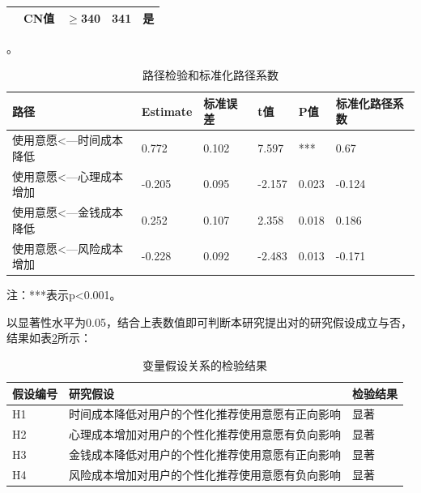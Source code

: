 \documentclass[12pt,UTF8]{ctexart}
\begin{document}
\begin{spacing}{1.25}
\begin{table}[H]
\begin{tabular}{@{}lllll@{}}
\textbf{}        & CN值                   & $\geq$340       & 341             & 是               \\ \bottomrule
\end{tabular}
\end{table}
。
\begin{table}[H]
\centering
\caption{路径检验和标准化路径系数}
\label{tab:road}
\begin{threeparttable}
\begin{tabular}{@{}llllll@{}}
\toprule
\textbf{路径}              & \textbf{Estimate} & \textbf{标准误差} & \textbf{t值} & \textbf{P值} & \textbf{标准化路径系数} \\ \midrule
使用意愿\textless{}---时间成本降低 & 0.772             & 0.102         & 7.597       & ***         & 0.67             \\
使用意愿\textless{}---心理成本增加 & -0.205            & 0.095         & -2.157      & 0.023       & -0.124           \\
使用意愿\textless{}---金钱成本降低 & 0.252             & 0.107         & 2.358       & 0.018       & 0.186            \\
使用意愿\textless{}---风险成本增加 & -0.228            & 0.092         & -2.483      & 0.013       & -0.171           \\ \bottomrule
\end{tabular}
\begin{tablenotes}
    \item 注：***表示p<0.001。
\end{tablenotes}
\end{threeparttable}
\end{table}
以显著性水平为0.05，结合上表数值即可判断本研究提出对的研究假设成立与否，结果如表\ref{tab:result}所示：
\begin{table}[H]
\centering
\caption{变量假设关系的检验结果}
\label{tab:result}
\begin{tabular}{@{}lll@{}}
\toprule
\textbf{假设编号} & \textbf{研究假设}            & \textbf{检验结果} \\ \midrule
H1            & 时间成本降低对用户的个性化推荐使用意愿有正向影响 & 显著            \\
H2            & 心理成本增加对用户的个性化推荐使用意愿有负向影响 & 显著            \\
H3            & 金钱成本降低对用户的个性化推荐使用意愿有正向影响 & 显著            \\
H4            & 风险成本增加对用户的个性化推荐使用意愿有负向影响 & 显著            \\ \bottomrule
\end{tabular}
\end{table}


\end{spacing}
\end{document}
